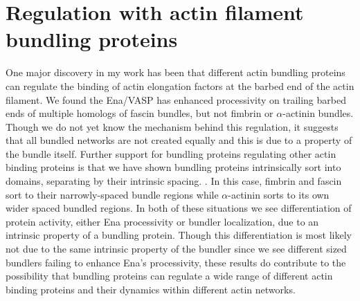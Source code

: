 \section{Regulation with actin filament bundling proteins}\label{ena-bundles-conclusions}
One major discovery in my work has been that different actin bundling proteins can regulate the binding of actin elongation factors at the barbed end of the actin filament. We found the Ena/VASP has enhanced processivity on trailing barbed ends of multiple homologs of fascin bundles, but not fimbrin or $\alpha$-actinin bundles. Though we do not yet know the mechanism behind this regulation, it suggests that all bundled networks are not created equally and this is due to a property of the bundle itself. Further support for bundling proteins regulating other actin binding proteins is that we have shown bundling proteins intrinsically sort into domains, separating by their intrinsic spacing. \citep{winkelman_fascin-_2016}. In this case, fimbrin and fascin sort to their narrowly-spaced bundle regions while $\alpha$-actinin sorts to its own wider spaced bundled regions. In both of these situations we see differentiation of protein activity, either Ena processivity or bundler localization, due to an intrinsic property of a bundling protein. Though this differentiation is most likely not due to the same intrinsic property of the bundler since we see different sized bundlers failing to enhance Ena's processivity, these results do contribute to the possibility that bundling proteins can regulate a wide range of different actin binding proteins and their dynamics within different actin networks. 

